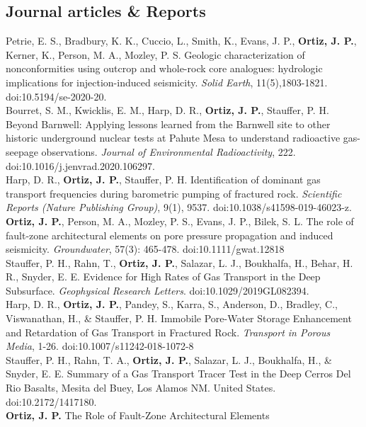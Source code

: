 \documentclass[11pt, letterpaper]{article}
\newcommand{\years}[1]{\marginnote{\scriptsize #1}}
\begin{document}
\subsection*{Journal articles \& Reports}
\noindent
\years{2020}Petrie, E. S., Bradbury, K. K., Cuccio, L., Smith, K., Evans, J.
P., \textbf{Ortiz, J. P.}, Kerner, K., Person, M. A., Mozley, P. S.
Geologic characterization of nonconformities using outcrop and whole-rock core
analogues: hydrologic implications for injection-induced seismicity.
\emph{Solid Earth}, 11(5),1803-1821. doi:10.5194/se-2020-20.\\
\years{2020}Bourret, S. M., Kwicklis, E. M., Harp, D. R., \textbf{Ortiz, J.
P.}, Stauffer, P. H. Beyond Barnwell: Applying lessons learned from the
Barnwell site to other historic underground nuclear tests at Pahute Mesa to
understand radioactive gas-seepage observations. \emph{Journal of Environmental
Radioactivity}, 222. doi:10.1016/j.jenvrad.2020.106297.\\
\years{2019}Harp, D. R., \textbf{Ortiz, J. P.}, Stauffer, P. H. Identification
of dominant gas transport frequencies during barometric pumping of fractured
rock. \emph{Scientific Reports (Nature Publishing Group)}, 9(1), 9537.
doi:10.1038/s41598-019-46023-z. \\ 
\years{2019}\textbf{Ortiz, J. P.}, Person,
M. A., Mozley, P. S., Evans, J. P., Bilek, S. L. The role of fault-zone
architectural elements on pore pressure propagation and induced seismicity.
\emph{Groundwater}, 57(3): 465-478. doi:10.1111/gwat.12818\\
\years{2019}Stauffer, P. H., Rahn, T., \textbf{Ortiz, J. P.}, Salazar, L. J.,
Boukhalfa, H., Behar, H. R., Snyder, E. E. Evidence for High Rates of Gas
Transport in the Deep Subsurface. \emph{Geophysical Research Letters}.
doi:10.1029/2019GL082394.\\ 
\years{2018}Harp, D. R., \textbf{Ortiz, J. P.},
Pandey, S., Karra, S., Anderson, D., Bradley, C., Viswanathan, H., \& Stauffer,
P. H. Immobile Pore-Water Storage Enhancement and Retardation of Gas Transport
in Fractured Rock. \emph{Transport in Porous Media}, 1-26.
doi:10.1007/s11242-018-1072-8\\ 
\years{2018}Stauffer, P. H., Rahn, T. A.,
\textbf{Ortiz, J. P.}, Salazar, L. J., Boukhalfa, H., \& Snyder, E. E. Summary
of a Gas Transport Tracer Test in the Deep Cerros Del Rio Basalts, Mesita del
Buey, Los Alamos NM. United States. doi:10.2172/1417180.\\
\years{2017}\textbf{Ortiz, J. P.} The Role of Fault-Zone Architectural Elements
\end{document}
